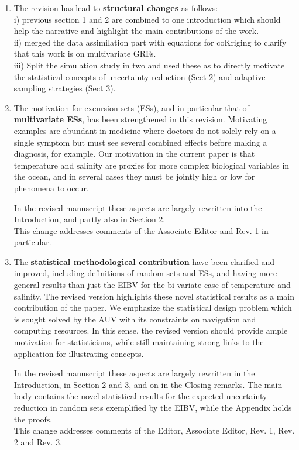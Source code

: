 \documentclass[a4paper]{article}
\begin{document}
\begin{enumerate}
\item The revision has lead to {\bf{structural changes}} as follows: \\
    i) previous section 1 and 2 are combined to one introduction which should help the narrative and highlight the main contributions of the work. \\
    ii) merged the data assimilation part with equations for coKriging to clarify that this work is on multivariate GRFs. \\
    iii) Split the simulation study in two and used these as to directly motivate the statistical concepts of uncertainty reduction (Sect 2) and adaptive sampling strategies (Sect 3).

\item The motivation for excursion sets (ESs), and in particular that of {\bf{multivariate ESs}}, has been strengthened in this revision. Motivating examples are abundant in medicine where doctors do not solely rely on a single symptom but must see several combined effects before making a diagnosis, for example. Our motivation in the current paper is that temperature and salinity are proxies for more complex biological variables in the ocean, and in several cases they must be jointly high or low for phenomena to occur. 

In the revised manuscript these aspects are largely rewritten into the Introduction, and partly also in Section 2. \\
This change addresses comments of the Associate Editor and Rev. 1 in particular.

\item The {\bf{statistical methodological contribution}} have been clarified and improved, including definitions of random sets and ESs, and having more general results than just the EIBV for the bi-variate case of temperature and salinity. The revised version highlights these novel statistical results as a main contribution of the paper. 
We emphasize the statistical design problem which is sought solved by the AUV with its constraints on navigation and computing resources.
In this sense, the revised version should provide ample motivation for statisticians, while still maintaining strong links to the application for illustrating concepts.

In the revised manuscript these aspects are largely rewritten in the Introduction, in Section 2 and 3, and on in the Closing remarks. The main body contains the novel statistical results for the expected uncertainty reduction in random sets exemplified by the EIBV, while the Appendix holds the proofs. \\
This change addresses comments of the Editor, Associate Editor, Rev. 1, Rev. 2 and Rev. 3.


\end{enumerate}
\end{document}
